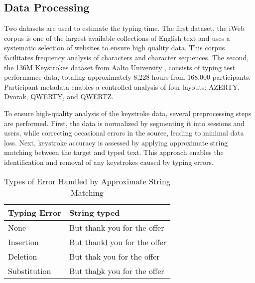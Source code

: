 \subsection{Data Processing}
Two datasets are used to estimate the typing time. The first dataset, the iWeb corpus \citep{iweb} is one of the largest available collections of English text and uses a systematic selection of websites to ensure high quality data. This corpus facilitates frequency analysis of characters and character sequences. The second, the 136M Keystrokes dataset from Aalto University \citep{dhakal2018observations}, consists of typing test performance data, totaling approximately 8,228 hours from 168,000 participants. Participant metadata enables a controlled analysis of four layouts: AZERTY, Dvorak, QWERTY, and QWERTZ.


To ensure high-quality analysis of the keystroke data, several preprocessing steps are performed. First, the data is normalized by segmenting it into sessions and users, while correcting occasional errors in the source, leading to minimal data loss. Next, keystroke accuracy is assessed by applying approximate string matching between the target and typed text. This approach enables the identification and removal of any keystrokes caused by typing errors.


\begin{table}[h]
\caption{Types of Error Handled by Approximate String Matching}
\begin{center}
\begin{tabular}{l|l}
Typing Error & String typed \\ \hline
None & But thank you for the offer \\
Insertion      & But thank\underline{l} you for the offer                     \\
Deletion       & But tha\underline{\hspace{0.2em}}k you for the offer                       \\
Substitution   & But tha\underline{b}k you for the offer                      \\
\end{tabular}
\end{center}
\label{fig:typing_errors}
\end{table}

